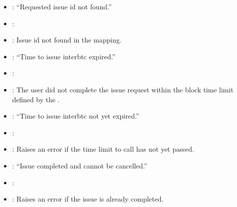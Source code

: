 \documentclass[a4paper,10pt,english]{sphinxmanual}
\begin{document}
\begin{itemize}
\item {} 
: “Requested issue id not found.”

\item {} 
: {\hyperref[\detokenize{spec/issue:executeissue}]{}}

\item {} 
: Issue id not found in the  mapping.

\end{itemize}

\begin{itemize}
\item {} 
: “Time to issue interbtc expired.”

\item {} 
: {\hyperref[\detokenize{spec/issue:executeissue}]{}}

\item {} 
: The user did not complete the issue request within the block time limit defined by the .

\end{itemize}

\begin{itemize}
\item {} 
: “Time to issue interbtc not yet expired.”

\item {} 
: {\hyperref[\detokenize{spec/issue:cancelissue}]{}}

\item {} 
: Raises an error if the time limit to call  has not yet passed.

\end{itemize}

\begin{itemize}
\item {} 
: “Issue completed and cannot be cancelled.”

\item {} 
: {\hyperref[\detokenize{spec/issue:cancelissue}]{}}

\item {} 
: Raises an error if the issue is already completed.

\end{itemize}
\end{document}
